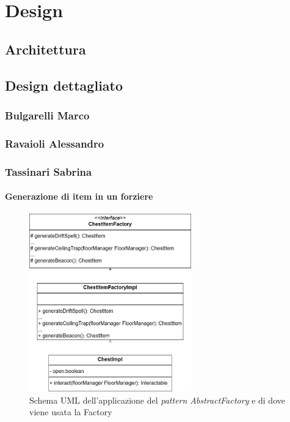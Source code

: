 \documentclass{report}
\begin{document}
\chapter{Design}

\section{Architettura}

\section{Design dettagliato}

\subsection{Bulgarelli Marco}

\subsection{Ravaioli Alessandro}

\subsection{Tassinari Sabrina}

\subsubsection{Generazione di item in un forziere}

\begin{figure}
    \centering
    \includegraphics[width=7cm]{patternFactory.drawio.png}
    \caption{Schema UML dell'applicazione del \textit{pattern AbstractFactory} e di dove viene usata la Factory}
    \label{img:chestItemFactory}
\end{figure}
\end{document}
